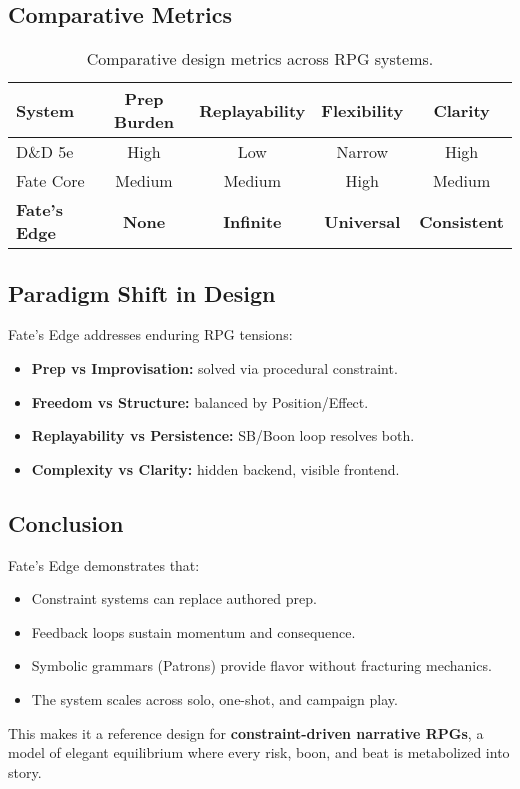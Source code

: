 \subsection{Comparative Metrics}

\begin{table}[H]
\centering
\renewcommand{\arraystretch}{1.2}
\begin{tabular}{lcccc}
\toprule
\textbf{System} & \textbf{Prep Burden} & \textbf{Replayability} & \textbf{Flexibility} & \textbf{Clarity} \\
\midrule
D\&D 5e & High & Low & Narrow & High \\
Fate Core & Medium & Medium & High & Medium \\
\textbf{Fate’s Edge} & \textbf{None} & \textbf{Infinite} & \textbf{Universal} & \textbf{Consistent} \\
\bottomrule
\end{tabular}
\caption{Comparative design metrics across RPG systems.}
\label{tab:comparative-metrics}
\end{table}

\subsection{Paradigm Shift in Design}

Fate’s Edge addresses enduring RPG tensions:
\begin{itemize}
  \item \textbf{Prep vs Improvisation:} solved via procedural constraint.  
  \item \textbf{Freedom vs Structure:} balanced by Position/Effect.  
  \item \textbf{Replayability vs Persistence:} SB/Boon loop resolves both.  
  \item \textbf{Complexity vs Clarity:} hidden backend, visible frontend.  
\end{itemize}

\subsection{Conclusion}

Fate’s Edge demonstrates that:
\begin{itemize}
  \item Constraint systems can replace authored prep.  
  \item Feedback loops sustain momentum and consequence.  
  \item Symbolic grammars (Patrons) provide flavor without fracturing mechanics.  
  \item The system scales across solo, one-shot, and campaign play.  
\end{itemize}

This makes it a reference design for \textbf{constraint-driven narrative RPGs}, a model of elegant equilibrium where every risk, boon, and beat is metabolized into story.
